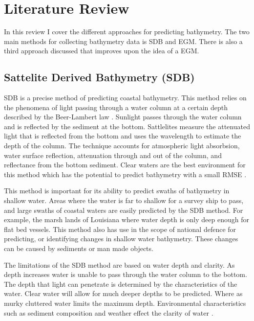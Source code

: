 \section{Literature Review}
\setlength{\parindent}{10ex}
In this review I cover the different approaches for predicting bathymetry.
The two main methods for collecting bathymetry data is \ac{SDB} and \ac{EGM}.
There is also a third approach discussed that improves upon the idea of a \ac{EGM}.


\subsection{Sattelite Derived Bathymetry (SDB)}
\ac{SDB} is a precise method of predicting coastal bathymetry. 
This method relies on the phenomena of light passing through a water column at a certain depth described by the Beer-Lambert law \cite{chybicki2018three}\cite{vinayaraj2016satellite}.
Sunlight passes through the water column and is reflected by the sediment at the bottom.
Sattlelites measure the attenuated light that is reflected from the bottom and uses the wavelength to estimate the depth of the column.
The technique accounts for atmospheric light absorbsion, water surface reflection, attenuation through and out of the column, and reflectance from the bottom sediment.
Clear waters are the best environment for this method which has the potential to predict bathymetry with a small RMSE \cite{chybicki2018three}.

\par
This method is important for its ability to predict swaths of bathymetry in shallow water.
Areas where the water is far to shallow for a survey ship to pass, and large swaths of coastal waters are easily predicted by the \ac{SDB} method.
For example, the marsh lands of Louisiana where water depth is only deep enough for flat bed vessels.
This method also has use in the scope of national defence for predicting, or identifying changes in shallow water bathymetry.
These changes can be caused by sediments or man made objects. 

\par
The limitations of the \ac{SDB} method are based on water depth and clarity.
As depth increases water is unable to pass through the water column to the bottom.
The depth that light can penetrate is determined by the characteristics of the water.
Clear water will allow for much deeper depths to be predicted.
Where as murky cluttered water limits the maximum depth.
Environmental characteristics such as sediment composition and weather effect the clarity of water \cite{vinayaraj2016satellite}.

